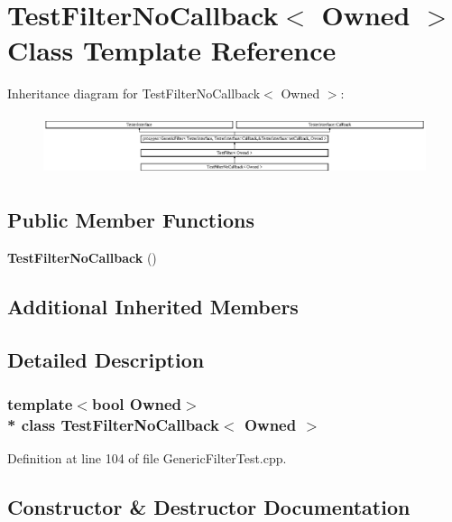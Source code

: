 \section{Test\+Filter\+No\+Callback$<$ Owned $>$ Class Template Reference}
\label{classTestFilterNoCallback}
Inheritance diagram for Test\+Filter\+No\+Callback$<$ Owned $>$\+:\begin{figure}[H]
\begin{center}
\leavevmode
\includegraphics[height=1.780604cm]{classTestFilterNoCallback}
\end{center}
\end{figure}
\subsection*{Public Member Functions}
\begin{DoxyCompactItemize}
\item 
{\bf Test\+Filter\+No\+Callback} ()
\end{DoxyCompactItemize}
\subsection*{Additional Inherited Members}


\subsection{Detailed Description}
\subsubsection*{template$<$bool Owned$>$\\*
class Test\+Filter\+No\+Callback$<$ Owned $>$}



Definition at line 104 of file Generic\+Filter\+Test.\+cpp.



\subsection{Constructor \& Destructor Documentation}
